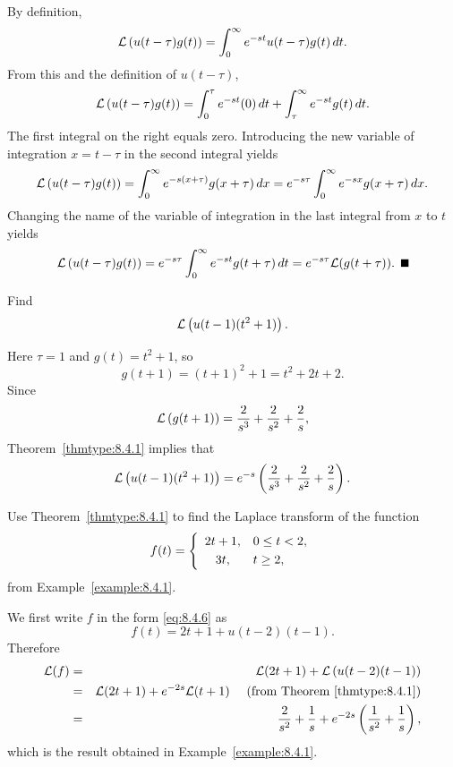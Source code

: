 \proof By definition,
\[
  {\cal L}\left(u(t-\tau)g(t)\right)=\int_{0}^{\infty}e^{-st}u(t-\tau)g(t)\, dt.
\]
From this and the definition of $u(t-\tau)$,
\[
  {\cal L}\left(u(t-\tau)g(t)\right)=\int_{0}^{\tau}e^{-st}(0)\,dt+\int_{\tau}^{\infty}e^{-st}g(t)\,dt.
\]
The first integral on the right equals zero. Introducing the new variable of integration $x=t-\tau$
in the second integral yields
\[
  {\cal L}\left(u(t-\tau)g(t)\right)=\int_{0}^{\infty}e^{-s(x+\tau)}g(x+\tau)\,dx =e^{-s\tau}\int_{0}^{\infty}e^{-sx}g(x+\tau)\,dx.
\]
Changing the name of the variable of integration in the last integral from $x$ to $t$ yields
\[
  {\cal L}\left(u(t-\tau)g(t)\right) =e^{-s\tau}\int_{0}^{\infty}e^{-st}g(t+\tau)\,dt=e^{-s\tau}{\cal L}(g(t+\tau)).\bbox
\]

\begin{example}
  \label{example:8.4.2}\rm Find
  \[
    {\cal L}\left(u(t-1)(t^{2}+1)\right).
  \]
\end{example}

\begin{examplesolution}
\solution Here $\tau=1$ and $g(t)=t^{2}+1$, so
\[
  g(t+1)=(t+1)^{2}+1=t^{2}+2t+2.
\]
Since
\[
  {\cal L}\left(g(t+1)\right)=\frac{2}{s^{3}}+\frac{2}{s^{2}}+\frac{2}{s},
\]
Theorem~\ref{thmtype:8.4.1} implies that
\[
  {\cal L}\left(u(t-1)(t^{2}+1)\right) =e^{-s}\left(\frac{2}{s^{3}}+\frac{2}{s^{2}}+\frac{2}{s}\right).
\]
\end{examplesolution}

\begin{example}
  \label{example:8.4.3}\rm Use Theorem~\ref{thmtype:8.4.1} to find the Laplace transform of the
  function
  \[
    f(t)=\left\{
    \begin{array}{cl}
      2t+1, & 0\le t<2, \\[1\jot]
      3t,   & t\ge2,
    \end{array}\right.
  \]
  from Example~\ref{example:8.4.1}.
\end{example}

\begin{examplesolution}
\solution We first write $f$ in the form \eqref{eq:8.4.6} as
\[
  f(t)=2t+1+u(t-2)(t-1).
\]
Therefore
\begin{eqnarray*}
  {\cal L}(f) & = & {\cal L}(2t+1)+{\cal L}\left(u(t-2)(t-1)\right)                                    \\
              & = & {\cal L}(2t+1)+e^{-2s}{\cal L}(t+1)\quad\mbox{ (from Theorem~\ref{thmtype:8.4.1}}) \\
              & = & \frac{2}{s^{2}}+\frac{1}{s}+e^{-2s}\left(\frac{1}{s^{2}}+\frac{1}{s}\right),
\end{eqnarray*}
which is the result obtained in Example~\ref{example:8.4.1}.\bbox
\end{examplesolution}

